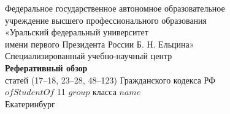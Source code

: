\documentclass[a4page]{report}
\begin{document}
\begin{titlepage}
    \center
    \Large

    Федеральное государственное автономное образовательное\\
    учреждение высшего профессионального образования\\
    «Уральский федеральный университет\\
    имени первого Президента России Б. Н. Ельцина»\\
    Специализированный учебно-научный центр\\

    \vfill
    \textbf{Реферативный обзор}\\
    статей (17--18, 23--28, 48--123) Гражданского кодекса РФ\\
    $ofStudentOf$ 11 $group$ класса $name$\\

    \vfill
    {Екатеринбург}\\
    {\the\year}\\
\end{titlepage}
\end{document}
